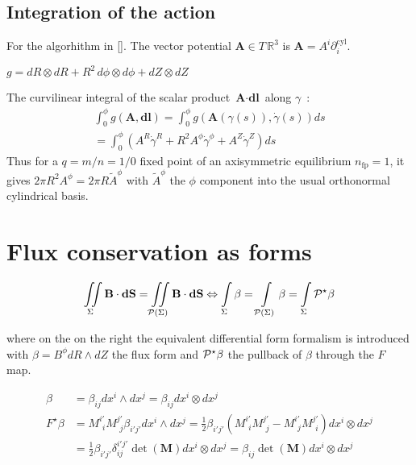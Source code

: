 \section{Integration of the action}

For the algorhithm in []. The vector potential $\textbf{A} \in T\,\mathbb{R}^3$ is $\textbf{A} =  A^i\partial_i^\text{cyl}$.

$g = dR\otimes dR + R^2\,d\phi\otimes d\phi + dZ\otimes dZ$

The curvilinear integral of the scalar product $\textbf{A}\cdot\textbf{dl}$ along $\gamma$~:
\begin{align*}
    \int_0^\phi g(\textbf{A},\textbf{dl}) = \int_0^\phi g(\textbf{A}(\gamma(s)),\dot{\gamma}(s))ds\\ = \int_0^\phi (A^R\dot{\gamma}^R + R^2A^\phi\dot{\gamma}^\phi + A^Z\dot{\gamma}^Z) ds
\end{align*}
Thus for a $q=m/n=1/0$ fixed point of an axisymmetric equilibrium $n_\text{fp} = 1$, it gives $2\pi R^2A^\phi = 2\pi R\tilde{A}^\phi$ with $\tilde{A}^\phi$ the $\phi$ component into the usual orthonormal cylindrical basis.

\chapter{Flux conservation as forms}\label{forms}

\begin{equation*}
    \iint\limits_{\Sigma}\textbf{B}\cdot\textbf{dS} = \iint\limits_{\mathcal{P}(\Sigma)}\textbf{B}\cdot\textbf{dS} \Leftrightarrow \int\limits_{\Sigma}\beta = \int\limits_{\mathcal{P}(\Sigma)}\beta = \int\limits_{\Sigma}\mathcal{P}^\star\beta
\end{equation*}

where on the on the right the equivalent differential form formalism is introduced with $\beta = B^\phi dR\wedge dZ$ the flux form and $\mathcal{P}^\star\beta$ the pullback of $\beta$ through the $F$ map.

\begin{align*}
    \beta &= \beta_{ij}dx^i\wedge dx^j = \beta_{ij}dx^i\otimes dx^j\\
    F^\star\beta &= M^{i'}_{\,\:i}M^{j'}_{\,\:j}\beta_{i'j'}dx^i\wedge dx^j = \frac{1}{2}\beta_{i'j'}\left(M^{i'}_{\,\:i}M^{j'}_{\,\:j}-M^{i'}_{\,\:j}M^{j'}_{\,\:i}\right)dx^i\otimes dx^j\\ &= \frac{1}{2}\beta_{i'j'}\delta^{i'j'}_{ij} \det(\textbf{M})dx^i\otimes dx^j = \beta_{ij}\det(\textbf{M})dx^i\otimes dx^j
\end{align*}


